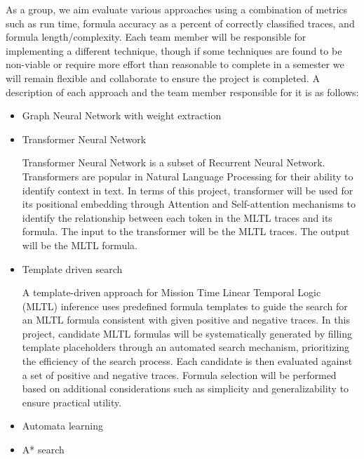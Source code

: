 \documentclass[12pt]{article}
\begin{document}
As a group, we aim evaluate various approaches using a combination of metrics such as run time, formula accuracy as a percent of correctly classified traces, and formula length/complexity.  
Each team member will be responsible for implementing a different technique, though if some techniques are found to be non-viable or require more effort than reasonable to complete in a semester we will remain flexible and collaborate to ensure the project is completed.
A description of each approach and the team member responsible for it is as follows:
\begin{itemize}
    \item Graph Neural Network with weight extraction
    \item Transformer Neural Network
	
	Transformer Neural Network is a subset of Recurrent Neural Network. Transformers are popular in Natural Language Processing for their ability to identify context in text. In terms of this project, transformer will be used for its positional embedding through Attention and Self-attention mechanisms to identify the relationship between each token in the MLTL traces and its formula. The input to the transformer will be the MLTL traces. The output will be the MLTL formula.
    
	\item Template driven search
	
  A template-driven approach for Mission Time Linear Temporal Logic (MLTL) inference uses predefined formula templates to guide the search for an MLTL formula consistent with given positive and negative traces. In this project, candidate MLTL formulas will be systematically generated by filling template placeholders through an automated search mechanism, prioritizing the efficiency of the search process. Each candidate is then evaluated against a set of positive and negative traces. Formula selection will be performed based on additional considerations such as simplicity and generalizability to ensure practical utility.

    \item Automata learning
    \item A* search
\end{itemize} 

\newpage
\end{document}
